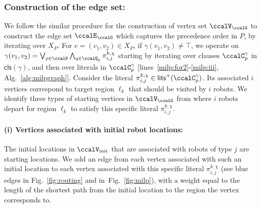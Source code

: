 \documentclass[Afour,sageh,times]{sagej}
\newcommand{\clause}[1]{\mathsf{cls}(#1)}
\renewcommand{\ap}[3]{\mathcal{\pi}_{{#1},{#2}}^{#3}}
\begin{document}
\subsubsection{Construction of  the edge set:}\label{sec:edge_set} We follow the similar procedure for the construction of vertex set $\ccalV_\ccalG$ to construct the edge set $\ccalE_\ccalG$ which captures the precedence order in ${P}$, by iterating over $X_P$. For $e = (v_1, v_2) \in X_{P}$, if $\gamma(v_1, v_2) \not=\top$, we operate on $\gamma(v_1, v_2) =  \bigvee_{p\in \ccalP} \bigwedge_{q \in \ccalQ_{p}} \ap{i}{j}{k,\chi}$ starting by iterating over clauses $\ccalC_p^{\gamma}$ in $\clause{\gamma}$, and then over literals in $\ccalC_p^\gamma$ [lines~\ref{milp:for2}-\ref{milp:iii}, Alg.~\ref{alg:milpgraph}]. Consider the literal $\ap{i}{j}{k,\chi} \in \mathsf{lits}^+(\ccalC_p^{\gamma})$. Its associated $i$ vertices correspond to target region $\ell_k$ that should be visited by $i$ robots. We identify three types of starting vertices in $\ccalV_\ccalG$ from where $i$ robots depart for region $\ell_k$ to satisfy this specific literal $\ap{i}{j}{k,\chi}$.
\paragraph{(i) Vertices associated with initial robot locations:}\label{sec:a} The initial locations in $\ccalV_{\text{init}}$ that are associated with  robots of type $j$ are starting locations. We add an edge from each vertex associated with such an initial location to each vertex associated with this specific literal $\ap{i}{j}{k,\chi}$ (see blue edges in Fig.~\ref{fig:routing} and in~Fig.~\ref{fig:milp}), with a weight equal to the length of the shortest path from the initial location to the region the vertex corresponds to.
\end{document}
